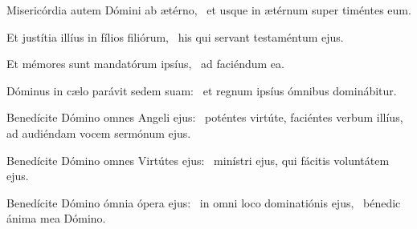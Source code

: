 \item Misericórdia autem Dómini ab ætérno,~\psstar{} et usque in ætérnum super timéntes eum.

\item Et justítia illíus in fílios filiórum,~\psstar{} his qui servant testaméntum ejus.

\item Et mémores sunt mandatórum ipsíus,~\psstar{} ad faciéndum ea.

\item Dóminus in cælo parávit sedem suam:~\psstar{} et regnum ipsíus ómnibus dominábitur.

\item Benedícite Dómino omnes Angeli ejus:~\pscross{} poténtes virtúte, faciéntes verbum illíus,~\psstar{} ad audiéndam vocem sermónum ejus.

\item Benedícite Dómino omnes Virtútes ejus:~\psstar{} minístri ejus, qui fácitis voluntátem ejus.

\item Benedícite Dómino ómnia ópera ejus:~\pscross{} in omni loco dominatiónis ejus,~\psstar{} bénedic ánima mea Dómino.
